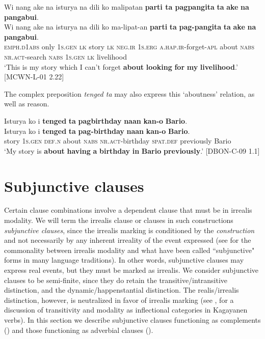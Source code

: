 \ea
Wi  nang  ake  na  isturya  na  dili  ko  malipatan \textbf{parti ta pagpangita}  \textbf{ta}  \textbf{ake}  \textbf{na}  \textbf{pangabui}. \smallskip\\
\gll Wi  nang  ake  na  isturya  na  dili  ko  ma-lipat-an \textbf{parti}  \textbf{ta}  \textbf{pag-pangita}  \textbf{ta}  \textbf{ake}  \textbf{na}  \textbf{pangabui}. \\
\textsc{emph.d}1\textsc{abs}  only  1\textsc{s.gen}  \textsc{lk}  story  \textsc{lk}  \textsc{neg.ir}  1\textsc{s.erg}  \textsc{a.hap.ir}-forget-\textsc{apl}
about  \textsc{nabs}  \textsc{nr.act}-search  \textsc{nabs}  1\textsc{s.gen}  \textsc{lk}  livelihood \\
\glt `This is my story which I can’t forget \textbf{about} \textbf{looking} \textbf{for} \textbf{my} \textbf{livelihood}.’ [MCWN-L-01 2.22]
\z

The complex preposition \textit{tenged ta} may also express this ‘aboutness’ relation, as well as reason.

\ea
Isturya  ko  i  \textbf{tenged}  \textbf{ta}  \textbf{pagbirthday}  \textbf{naan}  \textbf{kan-o}  \textbf{Bario}. \smallskip\\
\gll Isturya  ko  i  \textbf{tenged}  \textbf{ta}  \textbf{pag-birthday}  \textbf{naan}  \textbf{kan-o}  \textbf{Bario}. \\
story  1\textsc{s.gen}  \textsc{def.n}  about  \textsc{nabs}  \textsc{nr.act}-birthday  \textsc{spat.def}  previously  Bario \\
\glt ‘My story is \textbf{about} \textbf{having} \textbf{a} \textbf{birthday} \textbf{in} \textbf{Bario} \textbf{previously}.’ [DBON-C-09 1.1]
\z
\section{Subjunctive clauses}
\label{bkm:Ref477523359} \label{sec:subjunctiveclauses}
Certain clause combinations involve a dependent clause that must be in irrealis modality. We will term the irrealis clause or clauses in such constructions \textit{subjunctive clauses}\is{}, since the irrealis marking is conditioned by the \textit{construction} and not necessarily by any inherent irreality of the event expressed (see \citealt{givon1994} for the commonality between irrealis modality and what have been called ``subjunctive" forms in many language traditions). In other words, subjunctive clauses may express real events, but they must be marked as irrealis. We consider subjunctive clauses to be semi-finite, since they do retain the transitive/intransitive distinction, and the dynamic/happenstantial distinction. The realis/irrealis distinction, however, is neutralized in favor of irrealis marking (see ,  for a discussion of transitivity and modality as inflectional categories in Kagayanen verbs). In this section we describe subjunctive clauses functioning as complements () and those functioning as adverbial clauses ().

